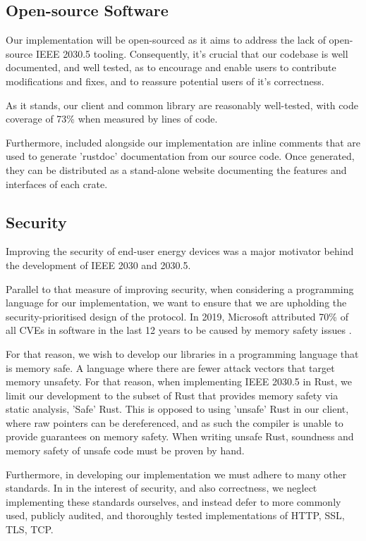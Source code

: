 \subsection{Open-source Software}
Our implementation will be open-sourced as it aims to address the lack of open-source IEEE 2030.5 tooling. Consequently, it's crucial that our codebase is well documented, and well tested, as to encourage and enable users to contribute modifications and fixes, and to reassure potential users of it's correctness.

As it stands, our client and common library are reasonably well-tested, with code coverage of 73\% when measured by lines of code.

Furthermore, included alongside our implementation are inline comments that are used to generate 'rustdoc' documentation from our source code. Once generated, they can be distributed as a stand-alone website documenting the features and interfaces of each crate.

\subsection{Security}
Improving the security of end-user energy devices was a major motivator behind the development of IEEE 2030 and 2030.5. 

Parallel to that measure of improving security, when considering a programming language for our implementation, we want to ensure that we are upholding the security-prioritised design of the protocol. In 2019, Microsoft attributed 70\% of all CVEs in software in the last 12 years to be caused by memory safety issues \cite[]{SecurityMemorySafety}. 

For that reason, we wish to develop our libraries in a programming language that is memory safe. A language where there are fewer attack vectors that target memory unsafety. For that reason, when implementing IEEE 2030.5 in Rust, we limit our development to the subset of Rust that provides memory safety via static analysis, 'Safe' Rust. This is opposed to using 'unsafe' Rust in our client, where raw pointers can be dereferenced, and as such the compiler is unable to provide guarantees on memory safety. When writing unsafe Rust, soundness and memory safety of unsafe code must be proven by hand.

Furthermore, in developing our implementation we must adhere to many other standards. In in the interest of security, and also correctness, we neglect implementing these standards ourselves, and instead defer to more commonly used, publicly audited, and thoroughly tested implementations of HTTP, SSL, TLS, TCP. 


